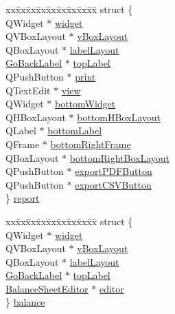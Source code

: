 \begin{CompactItemize}
\begin{tabbing}
\end{tabbing}\item 
\begin{tabbing}
xx\=xx\=xx\=xx\=xx\=xx\=xx\=xx\=xx\=\kill
struct \{\\
\>QWidget $\ast$ \hyperlink{classReportStack_r80}{widget}\\
\>QVBoxLayout $\ast$ \hyperlink{classReportStack_r81}{vBoxLayout}\\
\>QBoxLayout $\ast$ \hyperlink{classReportStack_r82}{labelLayout}\\
\>\hyperlink{classGoBackLabel}{GoBackLabel} $\ast$ \hyperlink{classReportStack_r83}{topLabel}\\
\>QPushButton $\ast$ \hyperlink{classReportStack_r84}{print}\\
\>QTextEdit $\ast$ \hyperlink{classReportStack_r85}{view}\\
\>QWidget $\ast$ \hyperlink{classReportStack_r86}{bottomWidget}\\
\>QHBoxLayout $\ast$ \hyperlink{classReportStack_r87}{bottomHBoxLayout}\\
\>QLabel $\ast$ \hyperlink{classReportStack_r88}{bottomLabel}\\
\>QFrame $\ast$ \hyperlink{classReportStack_r89}{bottomRightFrame}\\
\>QBoxLayout $\ast$ \hyperlink{classReportStack_r90}{bottomRightBoxLayout}\\
\>QPushButton $\ast$ \hyperlink{classReportStack_r91}{exportPDFButton}\\
\>QPushButton $\ast$ \hyperlink{classReportStack_r92}{exportCSVButton}\\
\} \hyperlink{classReportStack_r93}{report}\\

\end{tabbing}\item 
\begin{tabbing}
xx\=xx\=xx\=xx\=xx\=xx\=xx\=xx\=xx\=\kill
struct \{\\
\>QWidget $\ast$ \hyperlink{classReportStack_r94}{widget}\\
\>QVBoxLayout $\ast$ \hyperlink{classReportStack_r95}{vBoxLayout}\\
\>QBoxLayout $\ast$ \hyperlink{classReportStack_r96}{labelLayout}\\
\>\hyperlink{classGoBackLabel}{GoBackLabel} $\ast$ \hyperlink{classReportStack_r97}{topLabel}\\
\>\hyperlink{classBalanceSheetEditor}{BalanceSheetEditor} $\ast$ \hyperlink{classReportStack_r98}{editor}\\
\} \hyperlink{classReportStack_r99}{balance}\\


\end{tabbing}
\end{CompactItemize}
